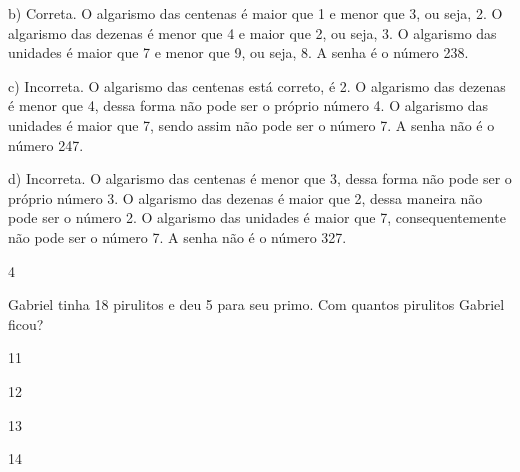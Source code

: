 \begin{escolha}
\begin{escolha}
{{{b) Correta. O algarismo das centenas é maior que 1 e menor que 3, ou
seja, 2. O algarismo das dezenas é menor que 4 e maior que 2, ou seja,
3. O algarismo das unidades é maior que 7 e menor que 9, ou seja, 8. A
senha é o número 238.

c) Incorreta. O algarismo das centenas está correto, é 2. O algarismo
das dezenas é menor que 4, dessa forma não pode ser o próprio número 4.
O algarismo das unidades é maior que 7, sendo assim não pode ser o
número 7. A senha não é o número 247.

d) Incorreta. O algarismo das centenas é menor que 3, dessa forma não
pode ser o próprio número 3. O algarismo das dezenas é maior que 2,
dessa maneira não pode ser o número 2. O algarismo das unidades é maior
que 7, consequentemente não pode ser o número 7. A senha não é o número
327.

\num{4}

Gabriel tinha 18 pirulitos e deu 5 para seu primo. Com quantos
pirulitos Gabriel ficou?

\begin{minipage}{.5\textwidth}
\begin{escolha}
\item 11

\item 12

\item 13

\item 14
\end{escolha}
\end{minipage}
}}}
\end{escolha}
\end{escolha}
